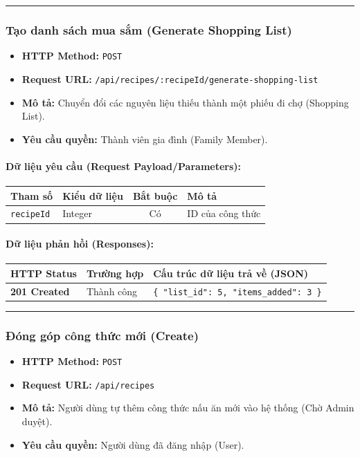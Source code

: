 \documentclass[12pt,a4paper]{article}
\begin{document}
\vskip 0.4cm
\noindent\rule{\textwidth}{0.3pt}
\vskip 0.4cm

\subsubsection{Tạo danh sách mua sắm (Generate Shopping List)}
\begin{itemize}[leftmargin=*]
    \item \textbf{HTTP Method:} \texttt{POST}
    \item \textbf{Request URL:} \texttt{/api/recipes/:recipeId/generate-shopping-list}
    \item \textbf{Mô tả:} Chuyển đổi các nguyên liệu thiếu thành một phiếu đi chợ (Shopping List).
    \item \textbf{Yêu cầu quyền:} Thành viên gia đình (Family Member).
\end{itemize}

\paragraph{Dữ liệu yêu cầu (Request Payload/Parameters):}
\begin{longtable}{|p{2.8cm}|p{2.2cm}|c|p{7.0cm}|}
\hline
\textbf{Tham số} & \textbf{Kiểu dữ liệu} & \textbf{Bắt buộc} & \textbf{Mô tả} \\ \hline
\endhead
\texttt{recipeId} & Integer & Có & ID của công thức \\ \hline
\end{longtable}

\paragraph{Dữ liệu phản hồi (Responses):}
\begin{longtable}{|p{2.8cm}|p{3.2cm}|p{8.0cm}|}
\hline
\textbf{HTTP Status} & \textbf{Trường hợp} & \textbf{Cấu trúc dữ liệu trả về (JSON)} \\ \hline
\endhead
\textbf{201 Created} & Thành công & \texttt{\{ "list\_id": 5, "items\_added": 3 \}} \\ \hline
\end{longtable}

\vskip 0.4cm
\noindent\rule{\textwidth}{0.3pt}
\vskip 0.4cm

\subsubsection{Đóng góp công thức mới (Create)}
\begin{itemize}[leftmargin=*]
    \item \textbf{HTTP Method:} \texttt{POST}
    \item \textbf{Request URL:} \texttt{/api/recipes}
    \item \textbf{Mô tả:} Người dùng tự thêm công thức nấu ăn mới vào hệ thống (Chờ Admin duyệt).
    \item \textbf{Yêu cầu quyền:} Người dùng đã đăng nhập (User).
\end{itemize}
\end{document}
